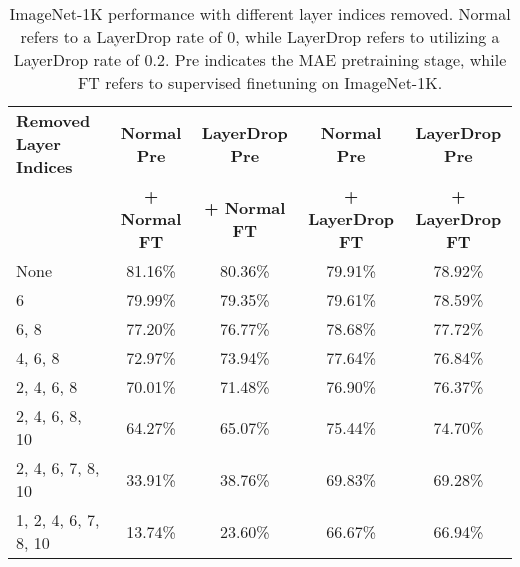 
\begin{table}[h]
\centering
\begin{tabular}{lcccc}
\toprule
\textbf{Removed Layer Indices} & \textbf{Normal Pre} & \textbf{LayerDrop Pre} & \textbf{Normal Pre} & \textbf{LayerDrop Pre} \\
                        & \textbf{+ Normal FT} & \textbf{+ Normal FT}   & \textbf{+ LayerDrop FT} & \textbf{+ LayerDrop FT} \\
\midrule
None           & 81.16\%                & 80.36\%                   & 79.91\%                   & 78.92\%                      \\
6              & 79.99\%                & 79.35\%                   & 79.61\%                   & 78.59\%                      \\
6, 8           & 77.20\%                & 76.77\%                   & 78.68\%                   & 77.72\%                      \\
4, 6, 8        & 72.97\%                & 73.94\%                   & 77.64\%                   & 76.84\%                      \\
2, 4, 6, 8     & 70.01\%                & 71.48\%                   & 76.90\%                   & 76.37\%                      \\
2, 4, 6, 8, 10 & 64.27\%                & 65.07\%                   & 75.44\%                   & 74.70\%                      \\
2, 4, 6, 7, 8, 10   & 33.91\%            & 38.76\%                   & 69.83\%                   & 69.28\%                      \\
1, 2, 4, 6, 7, 8, 10 & 13.74\%            & 23.60\%                   & 66.67\%                   & 66.94\%                      \\
\bottomrule
\end{tabular}
\caption{ImageNet-1K performance with different layer indices removed. Normal refers to a LayerDrop rate of 0, while LayerDrop refers to utilizing a LayerDrop rate of 0.2. Pre indicates the MAE pretraining stage, while FT refers to supervised finetuning on ImageNet-1K. }
\label{tab:layer_removal}
\end{table}

